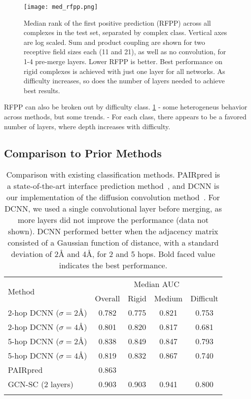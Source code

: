 \begin{figure}
	\texttt{[image: med\_rfpp.png]}
	\caption{Median rank of the first positive prediction (RFPP) across all complexes in the test set, separated by complex class. Vertical axes are log scaled. Sum and product coupling are shown for two receptive field sizes each (11 and 21), as well as no convolution, for 1-4 pre-merge layers. Lower RFPP is better. Best performance on rigid complexes is achieved with just one layer for all networks. As difficulty increases, so does the number of layers needed to achieve best results.
		\label{fig:med_rfpp}}
\end{figure}
	
RFPP can also be broken out by difficulty class.
\ref{fig:med_rfpp}
	- some heterogeneus behavior across methods, but some trends. 
	- For each class, there appears to be a favored number of layers, where depth increases with difficulty.



\subsection{Comparison to Prior Methods}



\begin{table}
	\begin{center}
		\begin{tabular}{l c c c c }
			\toprule
			\multirow{2}{*}{Method} & \multicolumn{4}{c}{Median AUC} \\
			& Overall & Rigid & Medium & Difficult \\
			\midrule
			2-hop DCNN ($\sigma=2$\AA{}) & 0.782 & 0.775 & 0.821 & 0.753 \\
			2-hop DCNN ($\sigma=4$\AA{}) & 0.801 & 0.820 & 0.817 & 0.681 \\
			\midrule
			5-hop DCNN ($\sigma=2$\AA{}) & 0.838 & 0.849 & 0.847 & 0.793 \\ 
			5-hop DCNN ($\sigma=4$\AA{}) & 0.819 & 0.832 & 0.867 & 0.740 \\ 
			\midrule
			PAIRpred      & 0.863        & & & \\
			\midrule
			GCN-SC (2 layers) & 0.903 & 0.903 & 0.941 & 0.800 \\ 
			\bottomrule
			\\
		\end{tabular}
		\caption{Comparison with existing classification methods. 
			PAIRpred is a state-of-the-art interface prediction method~\cite{minhas2014}, and DCNN is our implementation of the diffusion convolution method~\cite{atwood2016}.
			For DCNN, we used a single convolutional layer before merging, as more layers did not improve the performance (data not shown). DCNN performed better when the adjacency matrix consisted of a Gaussian function of distance, with a standard deviation of 2\AA{} and 4\AA{}, for 2 and 5 hops. Bold faced value indicates the best performance.}
		\label{tab:results_compare}
	\end{center}
\end{table}


